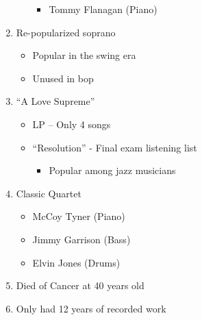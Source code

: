 \documentclass[]{article}
\providecommand{\tightlist}{%
  \setlength{\itemsep}{0pt}\setlength{\parskip}{0pt}}
\begin{document}
\begin{enumerate}
\begin{itemize}
    \begin{itemize}
    \tightlist
    \item
      Tommy Flanagan (Piano)
    \end{itemize}
  \end{itemize}
\item
  Re-popularized soprano

  \begin{itemize}
  \tightlist
  \item
    Popular in the swing era
  \item
    Unused in bop
  \end{itemize}
\item
  ``A Love Supreme''

  \begin{itemize}
  \tightlist
  \item
    LP -- Only 4 songs
  \item
    ``Resolution'' - Final exam listening list

    \begin{itemize}
    \tightlist
    \item
      Popular among jazz musicians
    \end{itemize}
  \end{itemize}
\item
  Classic Quartet

  \begin{itemize}
  \tightlist
  \item
    McCoy Tyner (Piano)
  \item
    Jimmy Garrison (Bass)
  \item
    Elvin Jones (Drums)
  \end{itemize}
\item
  Died of Cancer at 40 years old
\item
  Only had 12 years of recorded work
\end{enumerate}
\end{document}
